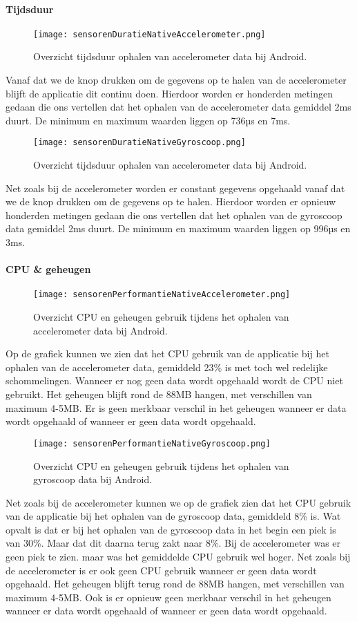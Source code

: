 \paragraph{Tijdsduur}
\begin{figure}[H]
    \centering
    \texttt{[image: sensorenDuratieNativeAccelerometer.png]}
    \caption{Overzicht tijdsduur ophalen van accelerometer data bij Android.}
\end{figure}
Vanaf dat we de knop drukken om de gegevens op te halen van de accelerometer blijft de applicatie
dit continu doen. Hierdoor worden er honderden metingen gedaan die ons vertellen dat het ophalen 
van de accelerometer data gemiddel 2ms duurt. De minimum en maximum waarden liggen op 736µs en 7ms.
\begin{figure}[H]
    \centering
    \texttt{[image: sensorenDuratieNativeGyroscoop.png]}
    \caption{Overzicht tijdsduur ophalen van accelerometer data bij Android.}
\end{figure}
Net zoals bij de accelerometer worden er constant gegevens opgehaald vanaf dat we de knop drukken om de 
gegevens op te halen. Hierdoor worden er opnieuw honderden metingen gedaan die ons vertellen dat het ophalen 
van de gyroscoop data gemiddel 2ms duurt. De minimum en maximum waarden liggen op 996µs en 3ms.

\paragraph{CPU \& geheugen}
\begin{figure}[H]
    \centering
    \texttt{[image: sensorenPerformantieNativeAccelerometer.png]}
    \caption{Overzicht CPU en geheugen gebruik tijdens het ophalen van accelerometer data bij Android.}
\end{figure}
Op de grafiek kunnen we zien dat het CPU gebruik van de applicatie bij het ophalen van de accelerometer data,
gemiddeld 23\% is met toch wel redelijke schommelingen. Wanneer er nog geen data wordt opgehaald wordt de CPU niet 
gebruikt. Het geheugen blijft rond de 88MB hangen, met verschillen van maximum 4-5MB. 
Er is geen merkbaar verschil in het geheugen wanneer er data wordt opgehaald of wanneer er 
geen data wordt opgehaald.
\begin{figure}[H]
    \centering
    \texttt{[image: sensorenPerformantieNativeGyroscoop.png]}
    \caption{Overzicht CPU en geheugen gebruik tijdens het ophalen van gyroscoop data bij Android.}
\end{figure}
Net zoals bij de accelerometer kunnen we op de grafiek zien dat het CPU gebruik van de applicatie bij het 
ophalen van de gyroscoop data, gemiddeld 8\% is. Wat opvalt is dat er bij het ophalen van de gyroscoop data
in het begin een piek is van 30\%. Maar dat dit daarna terug zakt naar 8\%. Bij de accelerometer was er geen
piek te zien. maar was het gemiddelde CPU gebruik wel hoger. Net zoals bij de accelerometer is er ook geen 
CPU gebruik wanneer er geen data wordt opgehaald. Het geheugen blijft terug rond de 88MB hangen, met 
verschillen van maximum 4-5MB. Ook is er opnieuw geen merkbaar verschil in het 
geheugen wanneer er data wordt opgehaald of wanneer er geen data wordt opgehaald.
  